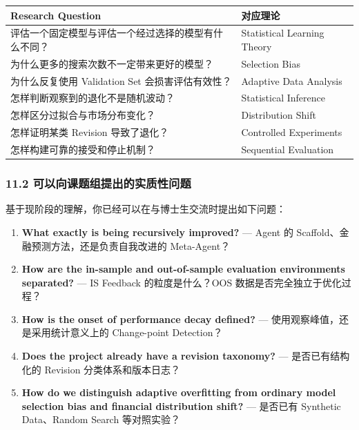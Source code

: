 \begin{readertable}
\begin{longtable}[]{@{}
  >{\raggedright\arraybackslash}p{}
  >{\raggedright\arraybackslash}p{}@{}}
\toprule
Research Question & 对应理论 \\
\midrule
\endhead
评估一个固定模型与评估一个经过选择的模型有什么不同？ & Statistical Learning Theory \\
为什么更多的搜索次数不一定带来更好的模型？ & Selection Bias \\
为什么反复使用 Validation Set 会损害评估有效性？ & Adaptive Data Analysis \\
怎样判断观察到的退化不是随机波动？ & Statistical Inference \\
怎样区分过拟合与市场分布变化？ & Distribution Shift \\
怎样证明某类 Revision 导致了退化？ & Controlled Experiments \\
怎样构建可靠的接受和停止机制？ & Sequential Evaluation \\
\bottomrule
\end{longtable}
\end{readertable}

\hypertarget{part-1-07-0001-ux53efux4ee5ux5411ux8bfeux9898ux7ec4ux63d0ux51faux7684ux5b9eux8d28ux6027ux95eeux9898}{%
\subsubsection{11.2 可以向课题组提出的实质性问题}\label{part-1-07-0001-ux53efux4ee5ux5411ux8bfeux9898ux7ec4ux63d0ux51faux7684ux5b9eux8d28ux6027ux95eeux9898}}

基于现阶段的理解，你已经可以在与博士生交流时提出如下问题：

\begin{enumerate}
\def\labelenumi{\arabic{enumi}.}
\item
  \textbf{What exactly is being recursively improved?} --- Agent 的 Scaffold、金融预测方法，还是负责自我改进的 Meta-Agent？
\item
  \textbf{How are the in-sample and out-of-sample evaluation environments separated?} --- IS Feedback 的粒度是什么？OOS 数据是否完全独立于优化过程？
\item
  \textbf{How is the onset of performance decay defined?} --- 使用观察峰值，还是采用统计意义上的 Change-point Detection？
\item
  \textbf{Does the project already have a revision taxonomy?} --- 是否已有结构化的 Revision 分类体系和版本日志？
\item
  \textbf{How do we distinguish adaptive overfitting from ordinary model selection bias and financial distribution shift?} --- 是否已有 Synthetic Data、Random Search 等对照实验？
\end{enumerate}

